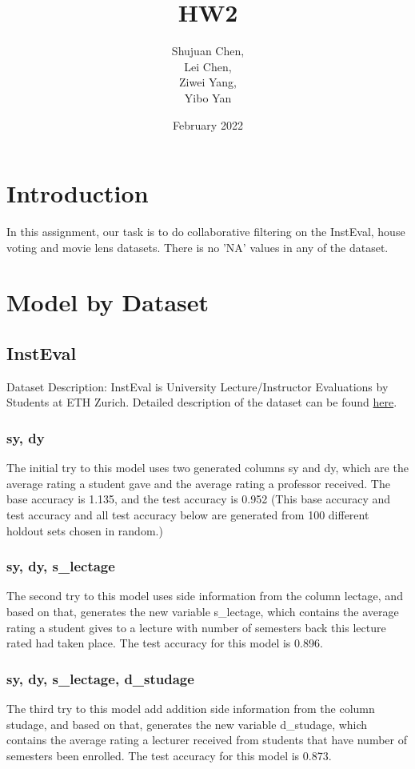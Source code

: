 \documentclass{article}
\title{HW2}
\author{Shujuan Chen,\\
Lei Chen,\\
Ziwei Yang,\\
Yibo Yan}
\date{February 2022}
\begin{document}
\maketitle

\section{Introduction}
In this assignment, our task is to do collaborative filtering on the InstEval, house voting and movie lens datasets. There is no 'NA' values in any of the dataset.

\section{Model by Dataset}
\subsection{InstEval}
Dataset Description:
InstEval is University Lecture/Instructor Evaluations by Students at ETH Zurich. Detailed description of the dataset can be found \href{https://rdrr.io/cran/lme4/man/InstEval.html}{here}.
\subsubsection{sy, dy}
The initial try to this model uses two generated columns sy and dy, which are the average rating a student gave and the average rating a professor received. The base accuracy is 1.135, and the test accuracy is 0.952 (This base accuracy and test accuracy and all test accuracy below are generated from 100 different holdout sets chosen in random.)
\subsubsection{sy, dy, s\_lectage}
The second try to this model uses side information from the column lectage, and based on that, generates the new variable s\_lectage, which contains the average rating a student gives to a lecture with number of semesters back this lecture rated had taken place. The test accuracy for this model is 0.896.
\subsubsection{sy, dy, s\_lectage, d\_studage}
The third try to this model add addition side information from the column studage, and based on that, generates the new variable d\_studage, which contains the average rating a lecturer received from students that have number of semesters been enrolled. The test accuracy for this model is 0.873.
\end{document}
